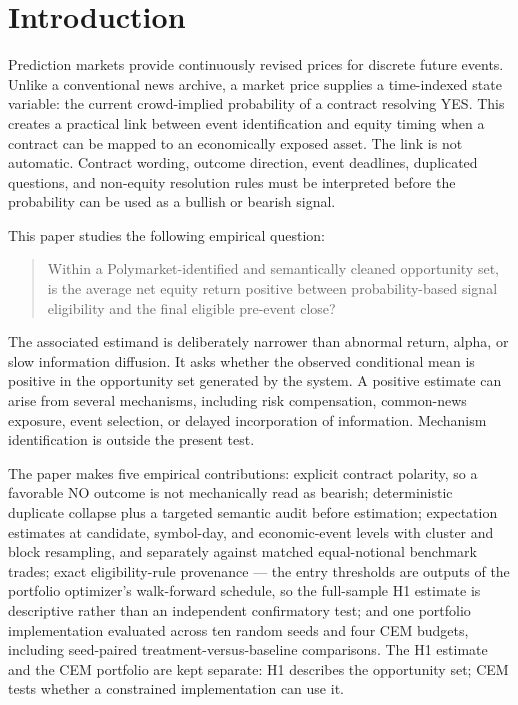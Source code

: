 \documentclass[sigconf,anonymous]{acmart}
\begin{document}
\section{Introduction}

Prediction markets provide continuously revised prices for discrete future events. Unlike a conventional news archive, a market price supplies a time-indexed state variable: the current crowd-implied probability of a contract resolving YES. This creates a practical link between event identification and equity timing when a contract can be mapped to an economically exposed asset. The link is not automatic. Contract wording, outcome direction, event deadlines, duplicated questions, and non-equity resolution rules must be interpreted before the probability can be used as a bullish or bearish signal.

This paper studies the following empirical question:

\begin{quote}
Within a Polymarket-identified and semantically cleaned opportunity set, is the average net equity return positive between probability-based signal eligibility and the final eligible pre-event close?
\end{quote}

The associated estimand is deliberately narrower than abnormal return, alpha, or slow information diffusion. It asks whether the observed conditional mean is positive in the opportunity set generated by the system. A positive estimate can arise from several mechanisms, including risk compensation, common-news exposure, event selection, or delayed incorporation of information. Mechanism identification is outside the present test.

The paper makes five empirical contributions: explicit contract polarity, so a favorable NO outcome is not mechanically read as bearish; deterministic duplicate collapse plus a targeted semantic audit before estimation; expectation estimates at candidate, symbol-day, and economic-event levels with cluster and block resampling, and separately against matched equal-notional benchmark trades; exact eligibility-rule provenance --- the entry thresholds are outputs of the portfolio optimizer's walk-forward schedule, so the full-sample H1 estimate is descriptive rather than an independent confirmatory test; and one portfolio implementation evaluated across ten random seeds and four CEM budgets, including seed-paired treatment-versus-baseline comparisons. The H1 estimate and the CEM portfolio are kept separate: H1 describes the opportunity set; CEM tests whether a constrained implementation can use it.
\end{document}
